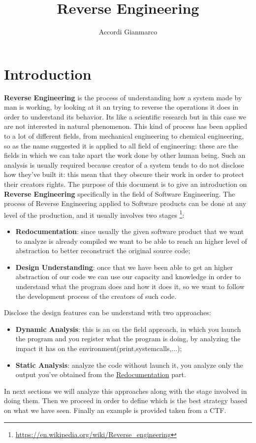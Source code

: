 \documentclass{article}
\author{Accordi Gianmarco}
\title{Reverse Engineering}
\date{}
\begin{document}
\maketitle

\section{Introduction}

\textbf{Reverse Engineering} is the process of understanding how a system made by man is working, by looking at it an trying to reverse the operations it does in order to understand its behavior.
Its like a scientific research but in this case we are not interested in natural phenomenon.
This kind of process has been applied to a lot of different fields, from mechanical engineering to chemical engineering, so as the name suggested it is applied to all field of engineering: these are the fields in which we can take apart the work done by other human being.
Such an analysis is usually required because creator of a system tends to do not disclose how they've built it: this mean that they obscure their work in order to protect their creators rights.
The purpose of this document is to give an introduction on \textbf{Reverse Engineering} specifically in the field of Software Engineering.
The process of Reverse Engineering applied to Software products can be done at any level of the production, and it usually involves two stages \footnote{\url{https://en.wikipedia.org/wiki/Reverse_engineering}}:
\begin{itemize}
    \item \textbf{Redocumentation}: since usually the given software product that we want to analyze is already compiled we want to be able to reach an higher level of abstraction to better reconstruct the original source code;
    \item \textbf{Design Understanding}: once that we have been able to get an higher abstraction of our code we can use our capacity and knowledge in order to understand what the program does and how it does it, so we want to follow the development process of the creators of such code.
\end{itemize}
Disclose the design features can be understand with two approaches:
\begin{itemize} 
    \item \textbf{Dynamic Analysis}: this is an on the field approach, in which you launch the program and you register what the program is doing, by analyzing the impact it has on the environment(print,systemcalls,...);
    \item \textbf{Static Analysis}: analyze the code without launch it, you analyze only the output you've obtained from the \underline{Redocumentation} part.
\end{itemize} 
In next sections we will analyze this approaches along with the stage involved in doing them.
Then we proceed in order to define which is the best strategy based on what we have seen. Finally an example is provided taken from a CTF. 
\end{document}
